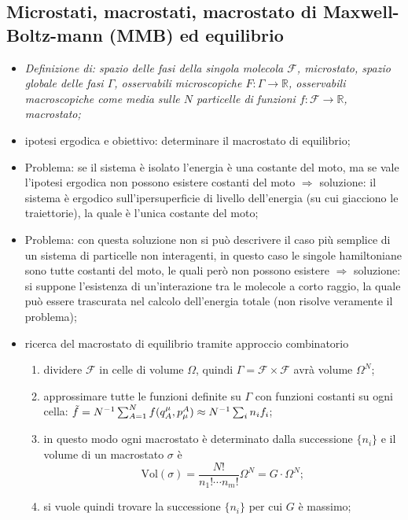 \documentclass{article}
\theoremstyle{remark}
\begin{document}
\subsection{Microstati, macrostati, macrostato di Maxwell-Boltz-mann (MMB) ed equilibrio}
\begin{itemize}
    \item \textit{Definizione di: spazio delle fasi della singola molecola $\mathcal{F}$, microstato, spazio globale delle fasi $\Gamma$, osservabili microscopiche $F:\Gamma\to\mathbb{R}$, osservabili macroscopiche come media sulle $N$ particelle di funzioni $f:\mathcal{F}\to\mathbb{R}$, macrostato;}
    \item ipotesi ergodica e obiettivo: determinare il macrostato di equilibrio;
    \item Problema: se il sistema è isolato l'energia è una costante del moto, ma se vale l'ipotesi ergodica non possono esistere costanti del moto $\Rightarrow$ soluzione: il sistema è ergodico sull'ipersuperficie di livello dell'energia (su cui giacciono le traiettorie), la quale è l'unica costante del moto;
    \item Problema: con questa soluzione non si può descrivere il caso più semplice di un sistema di particelle non interagenti, in questo caso le singole hamiltoniane sono tutte costanti del moto, le quali però non possono esistere $\Rightarrow$ soluzione: si suppone l'esistenza di un'interazione tra le molecole a corto raggio, la quale può essere trascurata nel calcolo dell'energia totale (non risolve veramente il problema);
    \item ricerca del macrostato di equilibrio tramite approccio combinatorio
    \begin{enumerate}
        \item dividere $\mathcal{F}$ in celle di volume $\Omega$, quindi $\Gamma=\mathcal{F}\times\mathcal{F}$ avrà volume $\Omega^N$;
        \item approssimare tutte le funzioni definite su $\Gamma$ con funzioni costanti su ogni cella: $\Tilde{f}=N^{-1}\sum_{A=1}^Nf(q^\mu_A,p_\mu^A)\approx N^{-1}\sum_in_if_i$;
        \item in questo modo ogni macrostato è determinato dalla successione $\{n_i\}$ e il volume di un macrostato $\sigma$ è
        \begin{equation}
            \text{Vol}(\sigma)=\frac{N!}{n_1!\cdots n_m!}\Omega^N=G\cdot\Omega^N;
        \end{equation}
        \item si vuole quindi trovare la successione $\{n_i\}$ per cui $G$ è massimo;

\end{enumerate}
\end{itemize}
\end{document}
